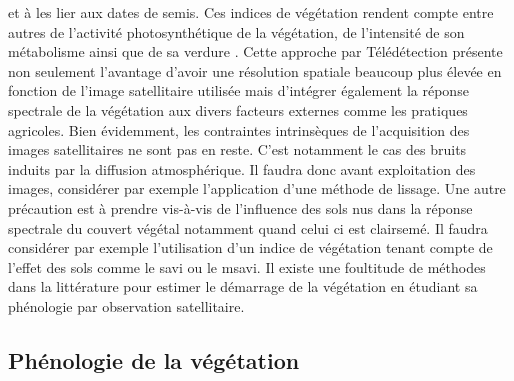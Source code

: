 et à les lier aux dates de semis. Ces indices de végétation rendent compte entre autres de l’activité photosynthétique de la
végétation, de l’intensité de son métabolisme ainsi que de sa verdure \citep{Duarte2018}. Cette approche par Télédétection présente non seulement l'avantage d'avoir une résolution 
spatiale beaucoup plus élevée en fonction de l'image 
satellitaire utilisée mais d'intégrer également la réponse spectrale de la végétation aux divers facteurs externes comme les pratiques agricoles. Bien évidemment, les contraintes intrinsèques de
l'acquisition des images satellitaires ne sont pas en reste. C'est notamment le cas des bruits induits par la diffusion atmosphérique. Il faudra donc avant exploitation des images, considérer 
par exemple l'application d'une méthode de lissage. Une autre précaution est à prendre vis-à-vis de l'influence des sols nus dans la réponse spectrale du couvert végétal 
notamment quand celui ci est clairsemé. Il faudra considérer par exemple l'utilisation d'un indice de végétation tenant compte de l'effet des sols comme le \acrshort{savi} ou le 
\acrshort{msavi}. Il existe une foultitude de méthodes dans la littérature pour estimer le démarrage de la végétation en étudiant sa phénologie par observation satellitaire. 
  
  \subsection{Phénologie de la végétation}
  

